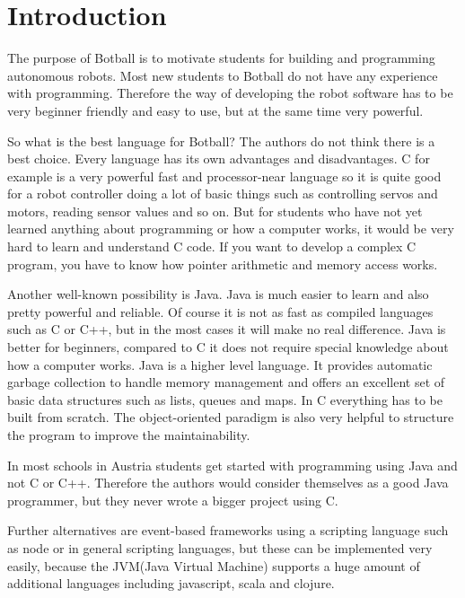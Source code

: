\documentclass{juniorjournal}
\author[1, \corresp]{Markus Klein}\correspemail{m@mklein.co.at}
\author[1]{Christoph Hackenberger}
\affil[1]{Vienna Institute of Technology}
\begin{document}
\maketitle

\articleabstract{}

\section{Introduction}
The purpose of Botball is to motivate students for building and programming autonomous robots.
Most new students to Botball do not have any experience with programming.
Therefore the way of developing the robot software has to be very beginner friendly and easy to use, 
but at the same time very powerful.

So what is the best language for Botball?
The authors do not think there is a best choice.
Every language has its own advantages and disadvantages.
C for example is a very powerful fast and processor-near language so it is quite good for a robot 
controller doing a lot of basic things such as controlling servos and motors, reading sensor values 
and so on. 
But for students who have not yet learned anything about programming or how a computer works, 
it would be very hard to learn and understand C code. 
If you want to develop a complex C program, you have to know how pointer arithmetic and memory 
access works.

Another well-known possibility is Java. 
Java is much easier to learn and also pretty powerful and reliable.
Of course it is not as fast as compiled languages such as C or C++, 
but in the most cases it will make no real difference.
Java is better for beginners, 
compared to C it does not require special knowledge about how a computer works.
Java is a higher level language.
It provides automatic garbage collection to handle memory management 
and offers an excellent set of basic data structures such as lists, queues and maps.
In C everything has to be built from scratch.
The object-oriented paradigm is also very helpful to structure the program 
to improve the maintainability.

In most schools in Austria students get started with programming using Java and not C or C++.
Therefore the authors would consider themselves as a good Java programmer, 
but they never wrote a bigger project using C.

Further alternatives are event-based frameworks using a scripting language 
such as node or in general scripting languages, but these can be implemented very easily, 
because the JVM(Java Virtual Machine) supports a huge amount of additional languages 
including javascript, scala and clojure.
%
\end{document}

